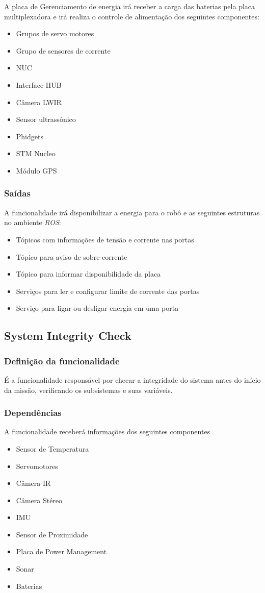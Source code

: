 A placa de Gerenciamento de energia irá receber a carga das baterias pela placa multiplexadora e irá realiza o controle de alimentação dos seguintes componentes:
\begin{itemize}
	\item Grupos de servo motores
	\item Grupo de sensores de corrente
	\item NUC
	\item Interface HUB
	\item Câmera LWIR
	\item Sensor ultrassônico
	\item Phidgets
	\item STM Nucleo
	\item Módulo GPS
\end{itemize}

\subsubsection{Saídas}
A funcionalidade irá disponibilizar a energia para o robô e as seguintes estruturas no ambiente \textit{ROS}:
\begin{itemize}
	\item Tópicos com informações de tensão e corrente nas portas
	\item Tópico para aviso de sobre-corrente
	\item Tópico para informar disponibilidade da placa
	\item Serviços para ler e configurar limite de corrente das portas
	\item Serviço para ligar ou desligar energia em uma porta	
\end{itemize}

\subsection{System Integrity Check}
\label{ssec:check}

\subsubsection{Definição da funcionalidade}
É a funcionalidade responsável por checar a integridade do sistema antes do início da missão, verificando os subsistemas e suas variáveis.

\subsubsection{Dependências}
A funcionalidade receberá informações dos seguintes componentes
\begin{itemize}
	\item Sensor de Temperatura
	\item Servomotores
	\item Câmera IR
	\item Câmera Stéreo
	\item IMU
	\item Sensor de Proximidade
	\item Placa de Power Management
	\item Sonar 
	\item Baterias
\end{itemize}

